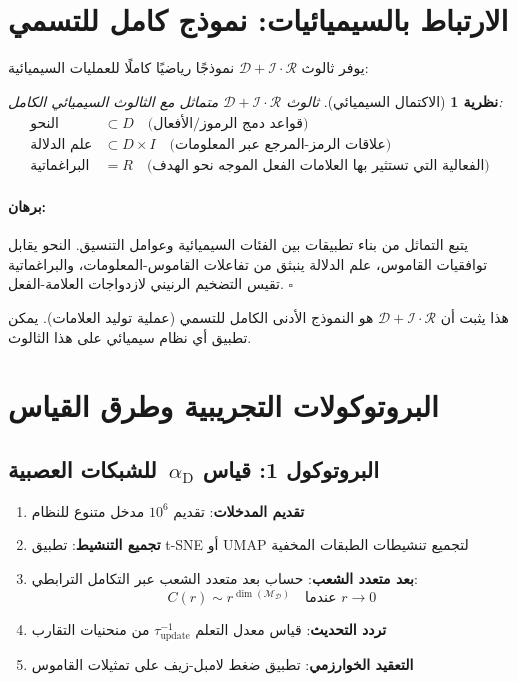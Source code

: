 \documentclass[12pt,a4paper]{article}
\newtheorem{theorem}{نظرية}
\renewenvironment{proof}{\paragraph{برهان:}}{\hfill$\square$}
\DeclareMathOperator{\dimension}{dim}
\DeclareRobustCommand{\alD}{\texorpdfstring{\ensuremath{\alpha_{\mathrm{D}}}}{alpha_D}}
\newcommand{\Dict}{\mathcal{D}}
\newcommand{\Mdict}{\mathcal{M}_{\Dict}}
\begin{document}
	\section{الارتباط بالسيميائيات: نموذج كامل للتسمي}
	
	يوفر ثالوث \(\mathcal{D}+\mathcal{I}\cdot\mathcal{R}\) نموذجًا رياضيًا كاملًا للعمليات السيميائية:
	
	\begin{theorem}[الاكتمال السيميائي]
		ثالوث \(\mathcal{D}+\mathcal{I}\cdot\mathcal{R}\) متماثل مع الثالوث السيميائي الكامل:
		\begin{align*}
			\text{النحو} &\subset D \quad \text{(قواعد دمج الرموز/الأفعال)} \\
			\text{علم الدلالة} &\subset D \times I \quad \text{(علاقات الرمز-المرجع عبر المعلومات)} \\
			\text{البراغماتية} &= R \quad \text{(الفعالية التي تستثير بها العلامات الفعل الموجه نحو الهدف)}
		\end{align*}
	\end{theorem}
	
	\begin{proof}
		يتبع التماثل من بناء تطبيقات بين الفئات السيميائية وعوامل التنسيق. النحو يقابل توافقيات القاموس، علم الدلالة ينبثق من تفاعلات القاموس-المعلومات، والبراغماتية تقيس التضخيم الرنيني لازدواجات العلامة-الفعل.
	\end{proof}
	
	هذا يثبت أن \(\mathcal{D}+\mathcal{I}\cdot\mathcal{R}\) هو النموذج الأدنى الكامل للتسمي (عملية توليد العلامات). يمكن تطبيق أي نظام سيميائي على هذا الثالوث.
	
	\section{البروتوكولات التجريبية وطرق القياس}
	
	\subsection{البروتوكول 1: قياس \alD\ للشبكات العصبية}
	\label{subsec:protocol-alpha}
	
	\begin{enumerate}
		\item \textbf{تقديم المدخلات}: تقديم \(10^6\) مدخل متنوع للنظام
		\item \textbf{تجميع التنشيط}: تطبيق t-SNE أو UMAP لتجميع تنشيطات الطبقات المخفية
		\item \textbf{بعد متعدد الشعب}: حساب بعد متعدد الشعب عبر التكامل الترابطي:
		\[
		C(r) \sim r^{\dimension(\Mdict)} \quad \text{عندما } r \to 0
		\]
		\item \textbf{تردد التحديث}: قياس معدل التعلم \(\tau_{\mathrm{update}}^{-1}\) من منحنيات التقارب
		\item \textbf{التعقيد الخوارزمي}: تطبيق ضغط لامبل-زيف على تمثيلات القاموس
	\end{enumerate}
	
\end{document}

